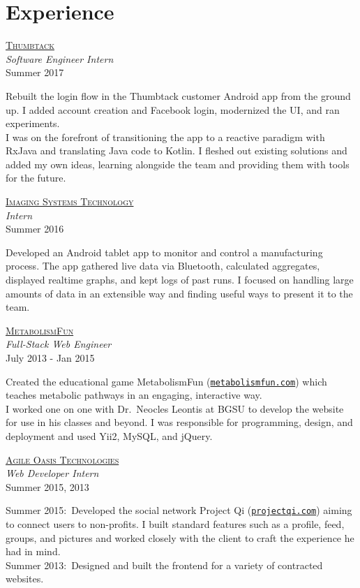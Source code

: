 \documentclass[letterpaper,10pt]{article}
\newcommand{\lb}{\vspace{4pt} \\}
\newenvironment{resumecols}[4]
{
    \vspace{.11cm}
    \begin{minipage}[t]{.21\linewidth}
        \begin{flushright}
            \href{#2}{\textsc{#1}} \\
            \small{\textit{#3}} \\
            \small{#4}
        \end{flushright}
    \end{minipage}
    \hspace{.005\linewidth}
    \begin{minipage}[t]{.77\linewidth}
}
{
    \end{minipage}
    \vspace{.11cm}
}
\begin{document}
\section{Experience}

\begin{resumecols}{Thumbtack}{https://www.thumbtack.com/about}{Software Engineer Intern}{Summer 2017}
    Rebuilt the login flow in the Thumbtack customer Android app from the ground up. I added account creation and Facebook login, modernized the UI, and ran experiments.
    \lb
    I was on the forefront of transitioning the app to a reactive paradigm with RxJava and translating Java code to Kotlin. I fleshed out existing solutions and added my own ideas, learning alongside the team and providing them with tools for the future.
\end{resumecols}

\begin{resumecols}{Imaging Systems Technology}{http://www.teamist.com}{Intern}{Summer 2016}
    Developed an Android tablet app to monitor and control a manufacturing process. The app gathered live data via Bluetooth, calculated aggregates, displayed realtime graphs, and kept logs of past runs. I focused on handling large amounts of data in an extensible way and finding useful ways to present it to the team.
\end{resumecols}

\begin{resumecols}{MetabolismFun}{http://metabolismfun.com}{Full-Stack Web Engineer}{July 2013 - Jan 2015}
    Created the educational game MetabolismFun (\href{http://metabolismfun.com}{\texttt{metabolismfun.com}}) which teaches metabolic pathways in an engaging, interactive way.
    \lb
    I worked one on one with Dr.\ Neocles Leontis at BGSU to develop the website for use in his classes and beyond. I was responsible for programming, design, and deployment and used Yii2, MySQL, and jQuery.
\end{resumecols}

\begin{resumecols}{Agile Oasis Technologies}{http://agileoasis.com}{Web Developer Intern}{Summer 2015, 2013}
    Summer 2015:\ Developed the social network Project Qi (\href{http://www.projectqi.com}{\texttt{projectqi.com}}) aiming to connect users to non-profits. I built standard features such as a profile, feed, groups, and pictures and worked closely with the client to craft the experience he had in mind.
    \lb
    Summer 2013:\ Designed and built the frontend for a variety of contracted websites.
\end{resumecols}
\end{document}
